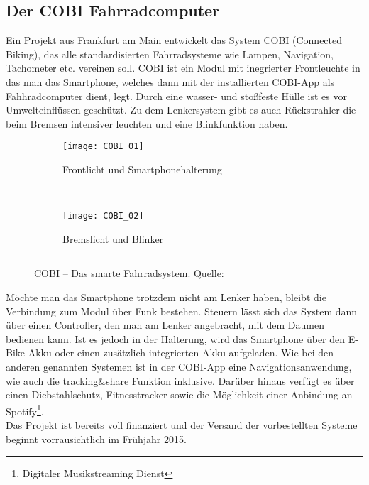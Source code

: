 \subsection{Der COBI Fahrradcomputer}
Ein Projekt aus Frankfurt am Main entwickelt das System \textsc{COBI} (Connected Biking), das alle standardisierten Fahrradsysteme wie Lampen, Navigation, Tachometer etc. vereinen soll. \textsc{COBI} ist ein Modul mit inegrierter Frontleuchte in das man das \gls{Smartphone}, welches dann mit der installierten \textsc{COBI}-\Gls{App} als Fahhradcomputer dient, legt. Durch eine wasser- und stoßfeste Hülle ist es vor Umwelteinflüssen geschützt. Zu dem Lenkersystem gibt es auch Rückstrahler die beim Bremsen intensiver leuchten und eine Blinkfunktion haben.
\begin{figure}[H]
        \centering
        \begin{subfigure}[b]{0.49\textwidth}
                \texttt{[image: COBI\_01]}
                \caption{Frontlicht und Smartphonehalterung}
                \label{fig:cobi1}
        \end{subfigure}%
        ~ %
        \begin{subfigure}[b]{0.49\textwidth}
                \texttt{[image: COBI\_02]}
                \caption{Bremslicht und Blinker}
                \label{fig:cobi2}
        \end{subfigure}
        \rule{35em}{0.5pt}
        \caption[COBI]{COBI -- Das smarte Fahrradsystem. Quelle: \cite{cobi_pic}}
        \label{fig:cobi}
\end{figure}
Möchte man das \gls{Smartphone} trotzdem nicht am Lenker haben, bleibt die Verbindung zum Modul über Funk bestehen. Steuern lässt sich das System dann über einen Controller, den man am Lenker angebracht, mit dem Daumen bedienen kann. Ist es jedoch in der Halterung, wird das \gls{Smartphone} über den E-Bike-Akku oder einen zusätzlich integrierten Akku aufgeladen. Wie bei den anderen genannten Systemen ist in der \textsc{COBI}-\Gls{App} eine Navigationsanwendung, wie auch die tracking\&share Funktion inklusive. Darüber hinaus verfügt es über einen Diebstahlschutz, Fitnesstracker sowie die Möglichkeit einer Anbindung an Spotify\footnote{ Digitaler Musikstreaming Dienst}.\\
Das Projekt ist bereits voll finanziert und der Versand der vorbestellten Systeme beginnt vorrausichtlich im Frühjahr 2015\cite{cobi}.
